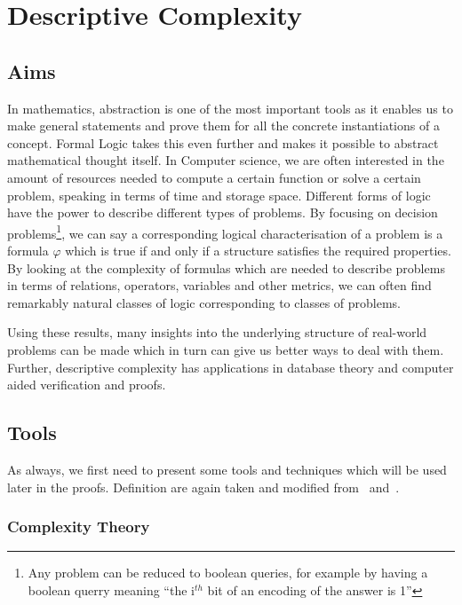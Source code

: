 \chapter{Descriptive Complexity}\label{ch:descriptive-complexity}


\section{Aims}\label{sec:aims}

In mathematics, abstraction is one of the most important tools as it enables us to make general statements and prove them for all the concrete instantiations of a concept.
Formal Logic takes this even further and makes it possible to abstract mathematical thought itself.
In Computer science, we are often interested in the amount of resources needed to compute a certain function or solve a certain problem, speaking in terms of time and storage space.
Different forms of logic have the power to describe different types of problems.
By focusing on decision problems\footnote{Any problem can be reduced to boolean queries, for example by having a boolean querry meaning ``the i$^{th}$ bit of an encoding of the answer is 1''}, we can say a corresponding logical characterisation of a problem is a formula $\varphi$ which is true if and only if a structure satisfies the required properties.
By looking at the complexity of formulas which are needed to describe problems in terms of relations, operators, variables and other metrics, we can often find remarkably natural classes of logic corresponding to classes of problems.

Using these results, many insights into the underlying structure of real-world problems can be made which in turn can give us better ways to deal with them.
Further, descriptive complexity has applications in database theory and computer aided verification and proofs.


\section{Tools}\label{sec:tools}

As always, we first need to present some tools and techniques which will be used later in the proofs.
Definition are again taken and modified from~\cite{theory-cs} and~\cite{descriptive-complexity}.

\subsection{Complexity Theory}\label{subsec:complexity-theory}


